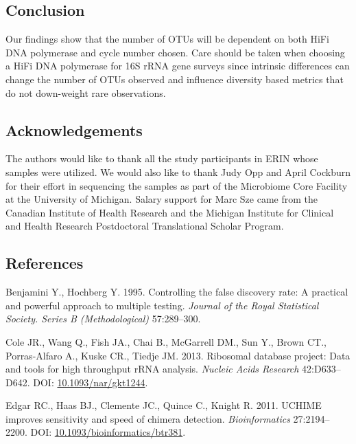 \documentclass[12pt,]{article}
\begin{document}
\subsection{Conclusion}\label{conclusion}

Our findings show that the number of OTUs will be dependent on both HiFi
DNA polymerase and cycle number chosen. Care should be taken when
choosing a HiFi DNA polymerase for 16S rRNA gene surveys since intrinsic
differences can change the number of OTUs observed and influence
diversity based metrics that do not down-weight rare observations.

\newpage

\subsection{Acknowledgements}\label{acknowledgements}

The authors would like to thank all the study participants in ERIN whose
samples were utilized. We would also like to thank Judy Opp and April
Cockburn for their effort in sequencing the samples as part of the
Microbiome Core Facility at the University of Michigan. Salary support
for Marc Sze came from the Canadian Institute of Health Research and the
Michigan Institute for Clinical and Health Research Postdoctoral
Translational Scholar Program.

\newpage

\subsection{References}\label{references}

\hypertarget{refs}{}
\hypertarget{ref-benjamini_controlling_1995}{}
Benjamini Y., Hochberg Y. 1995. Controlling the false discovery rate: A
practical and powerful approach to multiple testing. \emph{Journal of
the Royal Statistical Society. Series B (Methodological)} 57:289--300.

\hypertarget{ref-rdp_Cole_2013}{}
Cole JR., Wang Q., Fish JA., Chai B., McGarrell DM., Sun Y., Brown CT.,
Porras-Alfaro A., Kuske CR., Tiedje JM. 2013. Ribosomal database
project: Data and tools for high throughput rRNA analysis. \emph{Nucleic
Acids Research} 42:D633--D642. DOI:
\href{https://doi.org/10.1093/nar/gkt1244}{10.1093/nar/gkt1244}.

\hypertarget{ref-uchime_Edgar_2011}{}
Edgar RC., Haas BJ., Clemente JC., Quince C., Knight R. 2011. UCHIME
improves sensitivity and speed of chimera detection.
\emph{Bioinformatics} 27:2194--2200. DOI:
\href{https://doi.org/10.1093/bioinformatics/btr381}{10.1093/bioinformatics/btr381}.
\end{document}
